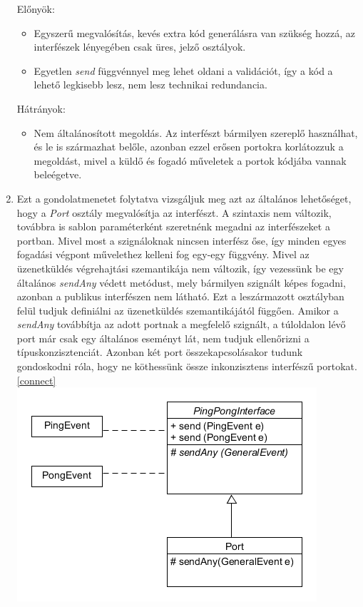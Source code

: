 \documentclass[a4paper,12pt]{report}
\begin{document}
\begin{enumerate}
Előnyök:
\begin{itemize}
\item Egyszerű megvalósítás, kevés extra kód generálásra van szükség hozzá, az interfészek lényegében csak üres, jelző osztályok.
\item Egyetlen \textit{send} függvénnyel meg lehet oldani a validációt, így a kód a lehető legkisebb lesz, nem lesz technikai redundancia.
\end{itemize}
Hátrányok:
\begin{itemize}
\item Nem általánosított megoldás. Az interfészt bármilyen szereplő használhat, és le is származhat belőle, azonban ezzel erősen portokra korlátozzuk a megoldást, mivel a küldő és fogadó műveletek a portok kódjába vannak beleégetve.
\end{itemize}
\item Ezt a gondolatmenetet folytatva vizsgáljuk meg azt az általános lehetőséget, hogy a \textit{Port} osztály megvalósítja az interfészt. A szintaxis nem változik, továbbra is sablon paraméterként szeretnénk megadni az interfészeket a portban. Mivel most a szignáloknak nincsen interfész őse, így minden egyes fogadási végpont művelethez kelleni fog egy-egy függvény. Mivel az üzenetküldés végrehajtási szemantikája nem változik, így vezessünk be egy általános \textit{sendAny} védett metódust, mely bármilyen szignált képes fogadni, azonban a publikus interfészen nem látható. Ezt a leszármazott osztályban felül tudjuk definiálni az üzenetküldés szemantikájától függően. Amikor a \textit{sendAny} továbbítja az adott portnak a megfelelő szignált, a túloldalon lévő port már csak egy általános eseményt lát, nem tudjuk ellenőrizni a típuskonzisztenciát. Azonban két port összekapcsolásakor tudunk gondoskodni róla, hogy ne köthessünk össze inkonzisztens interfészű portokat. \ref{connect} \\
\includegraphics[scale=0.7]{inf_ver2.png} \\

\end{enumerate}
\end{document}
